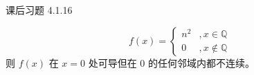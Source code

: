 \begin{problem}
	课后习题 4.1.16

	\begin{solution}
		$$
		f(x) = \begin{cases}
			n^2 & , x \in \mathbb{Q} \\
			0 & , x \notin \mathbb{Q}
		\end{cases}
		$$
		则 $f(x)$ 在 $x = 0$ 处可导但在 $0$ 的任何邻域内都不连续。
	\end{solution}
\end{problem}